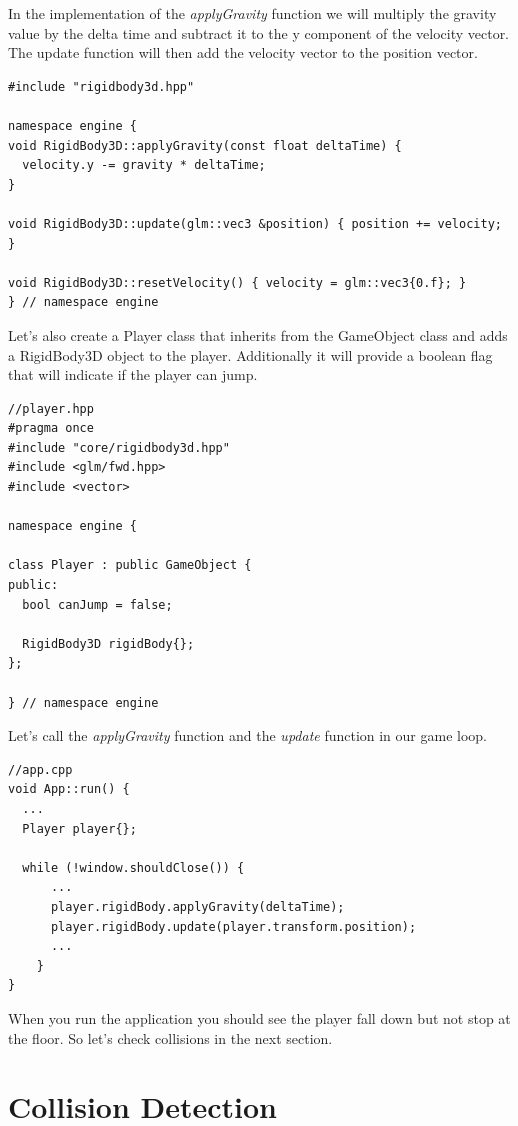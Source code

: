 \documentclass[12pt]{report} \usepackage{preamble}
\begin{document}
In the implementation of the \textit{applyGravity} function we will multiply the gravity value by the delta time
and subtract it to the y component of the velocity vector. The update function will then add the velocity vector to the position vector.

\begin{lstlisting}[Language=C++]
#include "rigidbody3d.hpp"

namespace engine {
void RigidBody3D::applyGravity(const float deltaTime) {
  velocity.y -= gravity * deltaTime;
}

void RigidBody3D::update(glm::vec3 &position) { position += velocity; }

void RigidBody3D::resetVelocity() { velocity = glm::vec3{0.f}; }
} // namespace engine
\end{lstlisting}

Let's also create a Player class that inherits from the GameObject class and adds a RigidBody3D object to the player.
Additionally it will provide a boolean flag that will indicate if the player can jump.

\begin{lstlisting}[Language=C++]
//player.hpp
#pragma once
#include "core/rigidbody3d.hpp"
#include <glm/fwd.hpp>
#include <vector>

namespace engine {

class Player : public GameObject {
public:
  bool canJump = false;

  RigidBody3D rigidBody{};
};

} // namespace engine
\end{lstlisting}

Let's call the \textit{applyGravity} function and the \textit{update} function in our game loop.

\begin{lstlisting}[Language=C++]
//app.cpp
void App::run() {
  ...
  Player player{};

  while (!window.shouldClose()) {
      ...
      player.rigidBody.applyGravity(deltaTime);
      player.rigidBody.update(player.transform.position);
      ...
    }
}
\end{lstlisting}

When you run the application you should see the player fall down but not stop at the floor.
So let's check collisions in the next section.

\section{Collision Detection}
\end{document}
